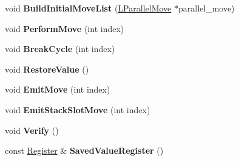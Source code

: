 \begin{DoxyCompactItemize}
\item 
void {\bfseries Build\+Initial\+Move\+List} (\hyperlink{classv8_1_1internal_1_1_l_parallel_move}{L\+Parallel\+Move} $\ast$parallel\+\_\+move)\hypertarget{classv8_1_1internal_1_1_b_a_s_e___e_m_b_e_d_d_e_d_a18e46b4919bd34c5ff192a955f86238d}{}\label{classv8_1_1internal_1_1_b_a_s_e___e_m_b_e_d_d_e_d_a18e46b4919bd34c5ff192a955f86238d}

\item 
void {\bfseries Perform\+Move} (int index)\hypertarget{classv8_1_1internal_1_1_b_a_s_e___e_m_b_e_d_d_e_d_a01fea4beaf81ccc3a326c14fdda8a2aa}{}\label{classv8_1_1internal_1_1_b_a_s_e___e_m_b_e_d_d_e_d_a01fea4beaf81ccc3a326c14fdda8a2aa}

\item 
void {\bfseries Break\+Cycle} (int index)\hypertarget{classv8_1_1internal_1_1_b_a_s_e___e_m_b_e_d_d_e_d_a5de6146d54eea60dd1d47b73b51a4905}{}\label{classv8_1_1internal_1_1_b_a_s_e___e_m_b_e_d_d_e_d_a5de6146d54eea60dd1d47b73b51a4905}

\item 
void {\bfseries Restore\+Value} ()\hypertarget{classv8_1_1internal_1_1_b_a_s_e___e_m_b_e_d_d_e_d_a5dca5ddf8849980c4195449ae562e8b9}{}\label{classv8_1_1internal_1_1_b_a_s_e___e_m_b_e_d_d_e_d_a5dca5ddf8849980c4195449ae562e8b9}

\item 
void {\bfseries Emit\+Move} (int index)\hypertarget{classv8_1_1internal_1_1_b_a_s_e___e_m_b_e_d_d_e_d_a50988d2a86b49713575ec93e3c922dcf}{}\label{classv8_1_1internal_1_1_b_a_s_e___e_m_b_e_d_d_e_d_a50988d2a86b49713575ec93e3c922dcf}

\item 
void {\bfseries Emit\+Stack\+Slot\+Move} (int index)\hypertarget{classv8_1_1internal_1_1_b_a_s_e___e_m_b_e_d_d_e_d_a73b51ba011d64c778176a3f37939b163}{}\label{classv8_1_1internal_1_1_b_a_s_e___e_m_b_e_d_d_e_d_a73b51ba011d64c778176a3f37939b163}

\item 
void {\bfseries Verify} ()\hypertarget{classv8_1_1internal_1_1_b_a_s_e___e_m_b_e_d_d_e_d_a46f1b6e1093c631ee3b7dfca3abc94e9}{}\label{classv8_1_1internal_1_1_b_a_s_e___e_m_b_e_d_d_e_d_a46f1b6e1093c631ee3b7dfca3abc94e9}

\item 
const \hyperlink{structv8_1_1internal_1_1_register}{Register} \& {\bfseries Saved\+Value\+Register} ()\hypertarget{classv8_1_1internal_1_1_b_a_s_e___e_m_b_e_d_d_e_d_af577d3a0703fc52a0c947c10c90e9550}{}\label{classv8_1_1internal_1_1_b_a_s_e___e_m_b_e_d_d_e_d_af577d3a0703fc52a0c947c10c90e9550}


\end{DoxyCompactItemize}
